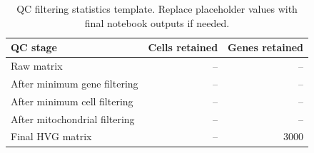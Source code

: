 \begin{table}[H]
\centering
\caption{QC filtering statistics template. Replace placeholder values with final notebook outputs if needed.}
\label{tab:qc_statistics}
\begin{tabular}{lrr}
\toprule
QC stage & Cells retained & Genes retained \\
\midrule
Raw matrix & -- & -- \\
After minimum gene filtering & -- & -- \\
After minimum cell filtering & -- & -- \\
After mitochondrial filtering & -- & -- \\
Final HVG matrix & -- & 3000 \\
\bottomrule
\end{tabular}
\end{table}
